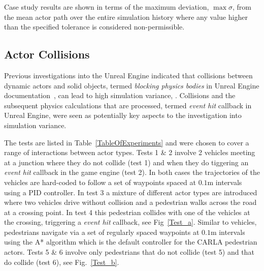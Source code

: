 \documentclass[letterpaper, 10 pt, journal, twoside]{IEEEtran}
\begin{document}
Case study results are shown in terms of the maximum deviation, $\max\sigma$, from the mean actor path over the entire simulation history where any value higher than the specified tolerance is considered non-permissible.
%



\subsection{Actor Collisions}\label{S:Actor_Collisions}
Previous investigations into the Unreal Engine indicated that collisions between dynamic actors and solid objects, termed \textit{blocking physics bodies} in Unreal Engine documentation~\cite{collision_overview}, can lead to high simulation variance, \cite{TSLUnrealEngineTesting}. 
%
Collisions and the subsequent physics calculations that are processed, termed \textit{event hit} callback in Unreal Engine, were seen as potentially key aspects to the investigation into simulation variance.

The tests are listed in Table~\ref{TableOfExperiments} and were chosen to cover a range of interactions between actor types. 
%
Tests 1 \& 2 involve 2 vehicles meeting at a junction where they do not collide (test 1) and when they do tiggering an \textit{event hit} callback in the game engine (test 2). In both cases the trajectories of the vehicles are hard-coded to follow a set of waypoints spaced at $0.1$m 
intervals using a PID controller. In test 3 a mixture of different actor types are introduced where two vehicles drive without collision and a pedestrian walks across the road at a crossing point. In test 4 this pedestrian collides with one of the vehicles at the crossing, triggering a \textit{event hit} callback, see Fig~\ref{Test_a}. Similar to vehicles, pedestrians navigate via a set of regularly spaced waypoints at $0.1$m intervals using the A* algorithm which is the default controller for the CARLA pedestrian actors. Tests 5 \& 6 involve only pedestrians that do not collide (test 5) and that do collide (test 6), see Fig.~\ref{Test_b}. 
\end{document}

